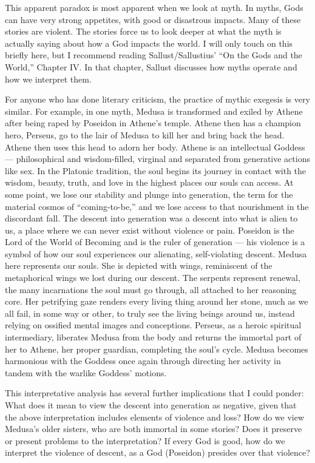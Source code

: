 \documentclass[
]{book}
\begin{document}
This apparent paradox is most apparent when we look at myth. In myths, Gods can have very strong appetites, with good or disastrous impacts. Many of these stories are violent. The stories force us to look deeper at what the myth is actually saying about how a God impacts the world. I will only touch on this briefly here, but I recommend reading Sallust/Sallustius' ``On the Gods and the World,'' Chapter IV. In that chapter, Sallust discusses how myths operate and how we interpret them.

For anyone who has done literary criticism, the practice of mythic exegesis is very similar. For example, in one myth, Medusa is transformed and exiled by Athene after being raped by Poseidon in Athene's temple. Athene then has a champion hero, Perseus, go to the lair of Medusa to kill her and bring back the head. Athene then uses this head to adorn her body. Athene is an intellectual Goddess --- philosophical and wisdom-filled, virginal and separated from generative actions like sex. In the Platonic tradition, the soul begins its journey in contact with the wisdom, beauty, truth, and love in the highest places our souls can access. At some point, we lose our stability and plunge into generation, the term for the material cosmos of ``coming-to-be,'' and we lose access to that nourishment in the discordant fall. The descent into generation was a descent into what is alien to us, a place where we can never exist without violence or pain. Poseidon is the Lord of the World of Becoming and is the ruler of generation --- his violence is a symbol of how our soul experiences our alienating, self-violating descent. Medusa here represents our souls. She is depicted with wings, reminiscent of the metaphorical wings we lost during our descent. The serpents represent renewal, the many incarnations the soul must go through, all attached to her reasoning core. Her petrifying gaze renders every living thing around her stone, much as we all fail, in some way or other, to truly see the living beings around us, instead relying on ossified mental images and conceptions. Perseus, as a heroic spiritual intermediary, liberates Medusa from the body and returns the immortal part of her to Athene, her proper guardian, completing the soul's cycle. Medusa becomes harmonious with the Goddess once again through directing her activity in tandem with the warlike Goddess' motions.

This interpretative analysis has several further implications that I could ponder: What does it mean to view the descent into generation as negative, given that the above interpretation includes elements of violence and loss? How do we view Medusa's older sisters, who are both immortal in some stories? Does it preserve or present problems to the interpretation? If every God is good, how do we interpret the violence of descent, as a God (Poseidon) presides over that violence?
\end{document}
